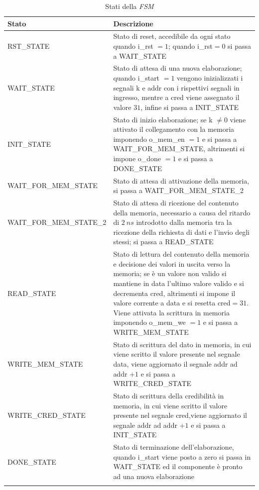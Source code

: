 \documentclass[11pt,a4paper]{article}
\newcommand{\m}[1]{{\fontfamily{zi4}\selectfont #1}}
\begin{document}
\begin{longtable}{l p{}}
        \toprule
        \textbf{Stato} & \textbf{Descrizione} \\
        \midrule
        \m{RST\_STATE} & Stato di reset, accedibile da ogni stato quando \m{i\_rst} $= 1$; quando \m{i\_rst}$=0$ si passa a \m{WAIT\_STATE} \\
        \addlinespace
        \m{WAIT\_STATE} & Stato di attesa di una nuova elaborazione; quando \m{i\_start} $= 1$ vengono inizializzati i segnali \m{k} e \m{addr} con i rispettivi segnali in ingresso, mentre a \m{cred} viene assegnato il valore $31$, infine si passa a \m{INIT\_STATE}\\
        \addlinespace
        \m{INIT\_STATE} & Stato di inizio elaborazione; se \m{k} $\neq 0$ viene attivato il collegamento con la memoria imponendo \m{o\_mem\_en} $=1$ e si passa a \m{WAIT\_FOR\_MEM\_STATE}, altrimenti si impone \m{o\_done} $=1$ e si passa a \m{DONE\_STATE}\\
        \addlinespace
        \m{WAIT\_FOR\_MEM\_STATE} & Stato di attesa di attivazione della memoria, si passa a \m{WAIT\_FOR\_MEM\_STATE\_2}\\
        \addlinespace
        \m{WAIT\_FOR\_MEM\_STATE\_2} & Stato di attesa di ricezione del contenuto della memoria, necessario a causa del ritardo di $2\ ns$ introdotto dalla memoria tra la ricezione della richiesta di dati e l'invio degli stessi; si passa a \m{READ\_STATE}\\
        \addlinespace
        \m{READ\_STATE} & Stato di lettura del contenuto della memoria e decisione dei valori in uscita verso la memoria; se è un valore non valido si mantiene in \m{data} l'ultimo valore valido e si decrementa \m{cred}, altrimenti si impone il valore corrente a \m{data} e si resetta \m{cred}$= 31$. Viene attivata la scrittura in memoria imponendo \m{o\_mem\_we} $= 1$ e si passa a \m{WRITE\_MEM\_STATE}\\
        \addlinespace
        \m{WRITE\_MEM\_STATE} & Stato di scrittura del dato in memoria, in cui viene scritto il valore presente nel segnale \m{data}, viene aggiornato il segnale \m{addr} ad \m{addr} $+ 1$ e si passa a \m{WRITE\_CRED\_STATE}\\
        \addlinespace
        \m{WRITE\_CRED\_STATE} & Stato di scrittura della credibilità in memoria, in cui viene scritto il valore presente nel segnale \m{cred},viene aggiornato il segnale \m{addr} ad \m{addr} $+ 1$ e si passa a \m{INIT\_STATE}\\
        \addlinespace
        \m{DONE\_STATE} & Stato di terminazione dell'elaborazione, quando \m{i\_start} viene posto a zero si passa in \m{WAIT\_STATE} ed il componente è pronto ad una nuova elaborazione \\
        \bottomrule
    \caption{Stati della \textit{FSM}}
    \label{tab:fsm}
\end{longtable}
\end{document}
